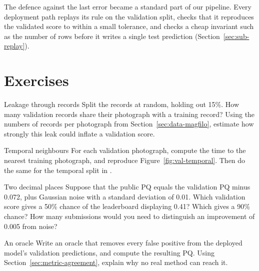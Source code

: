 The defence against the last error became a standard part of our pipeline. Every deployment path
replays its rule on the validation split, checks that it reproduces the validated score to within a
small tolerance, and checks a cheap invariant such as the number of rows before it writes a single
test prediction (Section~\ref{sec:sub-replay}).

\section*{Exercises}
\begin{exercise}{Leakage through records}
Split the records at random, holding out 15\%. How many validation records share their photograph
with a training record? Using the numbers of records per photograph from
Section~\ref{sec:data-magfilo}, estimate how strongly this leak could inflate a validation score.
\end{exercise}

\begin{exercise}{Temporal neighbours}
For each validation photograph, compute the time to the nearest training photograph, and reproduce
Figure~\ref{fig:val-temporal}. Then do the same for the temporal split in
.
\end{exercise}

\begin{exercise}{Two decimal places}
Suppose that the public PQ equals the validation PQ minus 0.072, plus Gaussian noise with a standard
deviation of 0.01. Which validation score gives a 50\% chance of the leaderboard displaying 0.41?
Which gives a 90\% chance? How many submissions would you need to distinguish an
improvement of 0.005 from noise?
\end{exercise}

\begin{exercise}{An oracle}
Write an oracle that removes every false positive from the deployed model's validation predictions,
and compute the resulting PQ. Using Section~\ref{sec:metric-agreement}, explain why no real method
can reach it.
\end{exercise}
